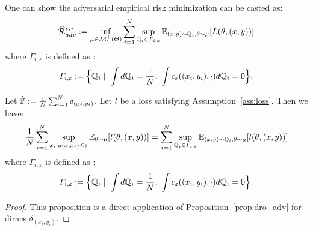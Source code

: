 One can show the adversarial empirical risk minimization can be casted as:
\begin{align*}
\widehat{\mathcal{R}}_{adv}^{\varepsilon,*}:=\inf_{\mu\in \mathcal{M}^+_1(\Theta)}\sum_{i=1}^\numsamples\sup_{\QQ_i\in\Gamma_{i,\varepsilon}}\mathbb{E}_{(x,y)\sim \QQ_i,\theta \sim \mu}\left[\loss(\theta,(x,y))\right]
\end{align*}
where $\Gamma_{i,\varepsilon}$ is defined as : 
\begin{align*}
    \Gamma_{i,\varepsilon}:=\Big\{\mathbb{Q}_i\mid~\int d\mathbb{Q}_i=\frac{1}{N},~\int c_{\varepsilon}((x_i,y_i),\cdot) d\mathbb{Q}_i=0\Big\}.
\end{align*}
\begin{prop}
    Let $\hat{\mathbb{P}}:=\frac1N\sum_{i=1}^N \delta_{(x_i,y_i)}$. Let $l$ be a loss satisfying Assumption~\ref{ass:loss}. Then we have:
    \begin{align*}
    \frac{1}{N}\sum_{i=1}^N\sup_{x,~d(x,x_i)\leq\varepsilon}\mathbb{E}_{\theta \sim \mu}\left[l(\theta,(x,y))\right]=\sum_{i=1}^N\sup_{\QQ_i\in\Gamma_{i,\varepsilon}}\mathbb{E}_{(x,y)\sim \QQ_i,\theta \sim \mu}\left[l(\theta,(x,y))\right]
    \end{align*}
    where $\Gamma_{i,\varepsilon}$ is defined as : 
    \begin{align*}
        \Gamma_{i,\varepsilon}:=\Big\{\mathbb{Q}_i\mid~\int d\mathbb{Q}_i=\frac{1}{N},~\int c_{\varepsilon}((x_i,y_i),\cdot) d\mathbb{Q}_i=0\Big\}.
    \end{align*}\end{prop}
    
    \begin{proof}
    This proposition is a direct application of Proposition~\ref{prop:dro_adv} for diracs $\delta_{(x_i,y_i)}$.
    \end{proof}
    
